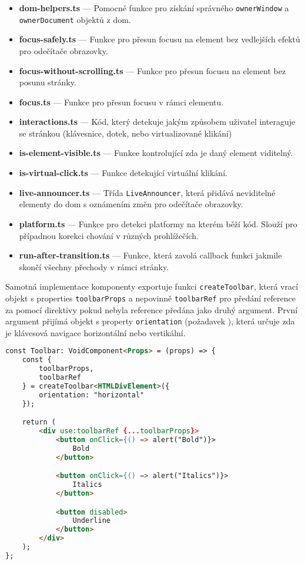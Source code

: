 \begin{itemize}
    \item \textbf{dom-helpers.ts} --- Pomocné funkce pro získání správného \texttt{ownerWindow} a \texttt{ownerDocument} objektů z \gls{dom}.
    \item \textbf{focus-safely.ts} --- Funkce pro přesun focusu na element bez vedlejších efektů pro odečítače obrazovky.
    \item \textbf{focus-without-scrolling.ts} --- Funkce pro přesun focusu na element bez posunu stránky.
    \item \textbf{focus.ts} --- Funkce pro přesun focusu v rámci elementu.
    \item \textbf{interactions.ts} --- Kód, který detekuje jakým způsobem uživatel interaguje se stránkou (klávesnice, dotek, nebo virtualizované klikání)
    \item \textbf{is-element-visible.ts} --- Funkce kontrolující zda je daný element viditelný.
    \item \textbf{is-virtual-click.ts} --- Funkce detekující virtuální klikání.
    \item \textbf{live-announcer.ts} --- Třída \texttt{LiveAnnouncer}, která přidává neviditelné elementy do \gls{dom} s oznámením změn pro odečítače obrazovky.
    \item \textbf{platform.ts} --- Funkce pro detekci platformy na kterém běží kód. Slouží pro případnou korekci chování v různých prohlížečích.
    \item \textbf{run-after-transition.ts} --- Funkce, která zavolá callback funkci jakmile skončí všechny přechody v rámci stránky.
\end{itemize}

Samotná implementace komponenty exportuje funkci \texttt{createToolbar}, která vrací objekt s properties \texttt{toolbarProps} a nepovinně \texttt{toolbarRef} pro předání reference za pomocí direktivy pokud nebyla reference předána jako druhý argument.
První argument přijímá objekt s property \texttt{orientation} (požadavek \hyperref[tfr12]{}), která určuje zda je klávesová navigace horizontální nebo vertikální.

\clearpage

\begin{lstlisting}[caption={Ukázka implementace Toolbar komponenty}, label={toolbar-example}, language=html]
const Toolbar: VoidComponent<Props> = (props) => {
    const {
        toolbarProps,
        toolbarRef
    } = createToolbar<HTMLDivElement>({
        orientation: "horizontal"
    });

    return (
        <div use:toolbarRef {...toolbarProps}>
            <button onClick={() => alert("Bold")}>
                Bold
            </button>

            <button onClick={() => alert("Italics")}>
                Italics
            </button>

            <button disabled>
                Underline
            </button>
        </div>
    );
};
\end{lstlisting}

